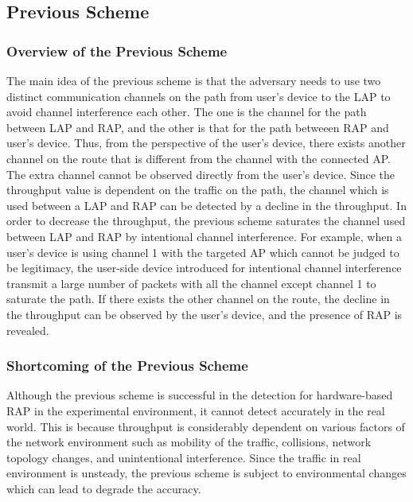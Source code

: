 \documentclass[conference]{IEEEtran}
\begin{document}
\subsection{Previous Scheme}
\subsubsection{Overview of the Previous Scheme}
The main idea of the previous scheme \cite{previous} is that the adversary needs to use two distinct communication channels on the path from user's device to the LAP to avoid channel interference each other.
The one is the channel for the path between LAP and RAP, and the other is that for the path betweeen RAP and user's device.
Thus, from the perspective of the user's device, there exists another channel on the route that is different from the channel with the connected AP.
The extra channel cannot be observed directly from the user's device.
Since the throughput value is dependent on the traffic on the path, the channel which is used between a LAP and RAP can be detected by a decline in the throughput.
In order to decrease the throughput, the previous scheme saturates the channel used between LAP and RAP by intentional channel interference.
For example, when a user's device is using channel 1 with the targeted AP which cannot be judged to be legitimacy, the user-side device introduced for intentional channel interference transmit a large number of packets with all the channel except channel 1 to saturate the path.
If there exists the other channel on the route, the decline in the throughput can be observed by the user's device, and the presence of RAP is revealed.

\subsubsection{Shortcoming of the Previous Scheme}
Although the previous scheme is successful in the detection for hardware-based RAP in the experimental environment, it cannot detect accurately in the real world.
This is because throughput is considerably dependent on various factors of the network environment such as mobility of the traffic, collisions, network topology changes, and unintentional interference.
Since the traffic in real environment is unsteady, the previous scheme is subject to environmental changes which can lead to degrade the accuracy.
\end{document}
